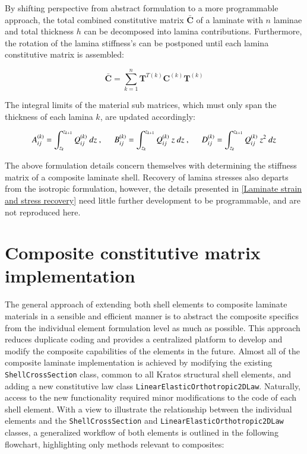 By shifting perspective from abstract formulation to a more programmable approach, the total combined constitutive matrix $\bar{\mathbf{C}}$ of a laminate with $n$ laminae and total thickness $h$ can be decomposed into lamina contributions. Furthermore, the rotation of the lamina stiffness's can be postponed until each lamina constitutive matrix is assembled:

\begin{equation} 
 \bar{\mathbf{C}} = \sum_{k=1}^{n}  \mathbf{T}^{T(k)} {\mathbf{C}}^{(k)}  \mathbf{T}^{(k)}
\label{eqscomp_laminate_form3}
\end{equation}

The integral limits of the material sub matrices, which must only span the thickness of each lamina $k$, are updated accordingly:

\begin{equation} 
A_{ij}^{(k)} = 
\int_{z_k}^{z_{k+1}}
{Q}_{ij}^{(k)}
\ dz\ ,
\hspace{5mm}
B_{ij}^{(k)} = 
\int_{z_k}^{z_{k+1}}
{Q}_{ij}^{(k)}\ z
\ dz\ ,
\hspace{5mm}
D_{ij}^{(k)} = 
\int_{z_k}^{z_{k+1}}
{Q}_{ij}^{(k)}\ z^2
\ dz
\label{eqscomp_laminate_form4}
\end{equation} 

The above formulation details concern themselves with determining the stiffness matrix of a composite laminate shell. Recovery of lamina stresses also departs from the isotropic formulation, however, the details presented in \ref{Laminate strain and stress recovery} need little further development to be programmable, and are not reproduced here.

\section{Composite constitutive matrix implementation}
The general approach of extending both shell elements to composite laminate materials in a sensible and efficient manner is to abstract the composite specifics from the individual element formulation level as much as possible. This approach reduces duplicate coding and provides a centralized platform to develop and modify the composite capabilities of the elements in the future. Almost all of the composite laminate implementation is achieved by modifying the existing \texttt{ShellCrossSection} class, common to all Kratos structural shell elements, and adding a new constitutive law class \texttt{LinearElasticOrthotropic2DLaw}. Naturally, access to the new functionality required minor modifications to the code of each shell element. With a view to illustrate the relationship between the individual elements and the \texttt{ShellCrossSection} and \texttt{LinearElasticOrthotropic2DLaw} classes, a generalized workflow of both elements is outlined in the following flowchart, highlighting only methods relevant to composites:

